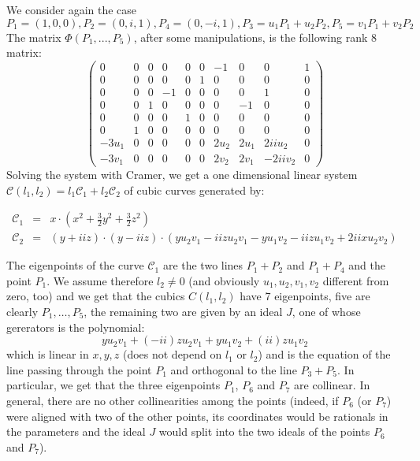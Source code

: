 \documentclass[10pt, a4paper, reqno, captions=tableheading,bibliography=totoc]{scrartcl}
\theoremstyle{plain}
\theoremstyle{definition}
\begin{document}
We consider again the case
\[
P_1 = (1, 0, 0), P_2 = (0, i, 1), P_4 = (0, -i, 1), P_3 = u_1P_1+u_2P_2,
P_5 = v_1P_1+v_2P_2
\]
The matrix $\Phi(P_1, ..., P_5)$, 
after some manipulations, is the following rank 8 matrix:
\begin{equation}
\left(\begin{array}{rrrrrrrrrr}
0 & 0 & 0 & 0 & 0 & 0 & -1 & 0 & 0 & 1 \\
0 & 0 & 0 & 0 & 0 & 1 & 0 & 0 & 0 & 0 \\
0 & 0 & 0 & -1 & 0 & 0 & 0 & 0 & 1 & 0 \\
0 & 0 & 1 & 0 & 0 & 0 & 0 & -1 & 0 & 0 \\
0 & 0 & 0 & 0 & 1 & 0 & 0 & 0 & 0 & 0 \\
0 & 1 & 0 & 0 & 0 & 0 & 0 & 0 & 0 & 0 \\
-3 u_{1} & 0 & 0 & 0 & 0 & 0 & 2 u_{2} & 2 u_{1} & 2 \mathit{ii} u_{2} & 0 \\
-3 v_{1} & 0 & 0 & 0 & 0 & 0 & 2 v_{2} & 2 v_{1} & -2 \mathit{ii} v_{2} & 0
\end{array}\right)
\label{matriceBella}
\end{equation}
Solving the system with Cramer, we get a one dimensional linear system
$\mathcal{C}(l_1, l_2) = l_1\mathcal{C}_1+l_2\mathcal{C}_2$ of cubic
curves generated by:

\begin{eqnarray}
  \mathcal{C}_1 & = & x \cdot \left(x^{2} + \frac{3}{2} y^{2} +
\frac{3}{2} z^{2}\right)\\
  \mathcal{C}_2 & = & (y + \mathit{ii} z) \cdot (y - \mathit{ii} z) \cdot (y u_{2} v_{1} - \mathit{ii} z u_{2} v_{1} - y u_{1} v_{2} - \mathit{ii} z u_{1} v_{2} + 2 \mathit{ii} x u_{2} v_{2})  \nonumber
\label{famigliaCubDim1}
\end{eqnarray}

The eigenpoints of the curve $\mathcal{C}_1$
are the two lines $P_1+P_2$ and $P_1+P_4$ and the point $P_1$.
We assume therefore $l_2 \not= 0$ (and obviously
$u_1, u_2, v_1, v_2$ different from zero, too) and we get that the cubics
$C(l_1, l_2)$ have 7
eigenpoints, five are clearly $P_1, \dots, P_5$,
the remaining two are given by an ideal $J$, one of whose gererators is the
polynomial:
\[
yu_2v_1 + (-ii)zu_2v_1 + yu_1v_2 + (ii)zu_1v_2
\]
which is linear in $x, y, z$ (does not depend on $l_1$ or $l_2$)
and is the equation of the line passing
through the point $P_1$ and orthogonal to the line $P_3+P_5$. In particular,
we get that the three eigenpoints $P_1$, $P_6$ and $P_7$ are collinear.
In general, there are no other collinearities among the points (indeed, if
$P_6$ (or $P_7$) were aligned with two of the other points, its coordinates
would be rationals in the parameters and the ideal $J$ would split
into the two ideals of the points $P_6$ and $P_7$).
\end{document}
